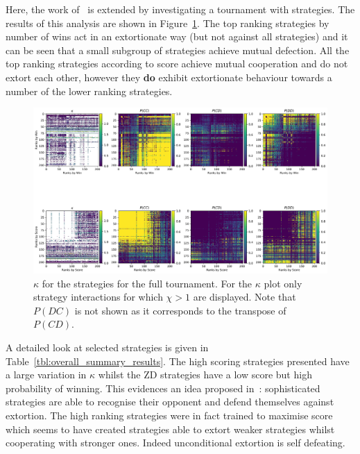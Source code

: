 \documentclass[a4paper]{article}
\begin{document}
Here, the work of~\cite{Stewart2012} is extended by investigating a tournament
with strategies. The
results of this analysis are shown in
Figure~\ref{fig:kappa_and_probabilities_in_full}. The top ranking strategies
by number of wins act in an extortionate way (but not against all strategies) and
it can be seen that a small subgroup of strategies achieve mutual defection.
All the top ranking strategies according to score achieve mutual cooperation and
do not extort each other, however they \textbf{do} exhibit extortionate
behaviour towards a number of the lower ranking strategies.

\begin{figure}[!htbp]
    \centering
    \includegraphics[width=.95\textwidth]{./assets/img/kappa_and_probabilities_in_full/main.pdf}
    \caption{\(\kappa\) for the strategies for the full
        tournament. For the \(\kappa\) plot only strategy
        interactions for which \(\chi>1\) are displayed. Note that
        \(P(DC)\) is not shown as it corresponds to the transpose of \(P(CD)\).}
    \label{fig:kappa_and_probabilities_in_full}
\end{figure}

A detailed look at selected strategies is given in
Table~\ref{tbl:overall_summary_results}. The high scoring strategies presented
have a large variation in \(\kappa\) whilst the ZD strategies have a low score
but high probability of winning. This evidences an idea proposed
in~\cite{adami2013evolutionary}: sophisticated strategies are able to recognise
their opponent and defend themselves against extortion.
The high ranking strategies were in fact trained to maximise
score~\cite{Harper2017} which seems to have created strategies able to extort
weaker strategies whilst cooperating with stronger ones. Indeed unconditional
extortion is self defeating.
\end{document}
